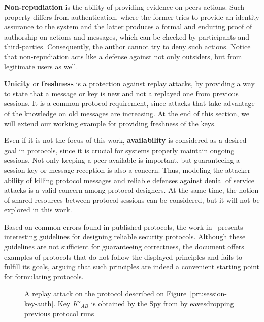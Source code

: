 \textbf{Non-repudiation} is the ability of providing evidence on peers actions. Such property differs from authentication, where the former tries to provide an identity assurance to the system and the latter produces a formal and enduring proof of authorship on actions and messages, which can be checked by participants and third-parties. Consequently, the author cannot try to deny such actions. Notice that non-repudiation acts like a defense against not only outsiders, but from legitimate users as well.

\textbf{Unicity} or \textbf{freshness} is a protection against replay attacks, by providing a way to state that a message or key is new and not a replayed one from previous sessions. It is a common protocol requirement, since attacks that take advantage of the knowledge on old messages are increasing. At the end of this section, we will extend our working example for providing freshness of the keys.

Even if it is not the focus of this work, \textbf{availability} is considered as a desired goal in protocols, since it is crucial for systems properly maintain ongoing sessions. Not only keeping a peer available is important, but guaranteeing a session key or message reception is also a concern. Thus, modeling the attacker ability of killing protocol messages and reliable defenses against denial of service attacks is a valid concern among protocol designers. At the same time, the notion of shared resources between protocol sessions can be considered, but it will not be explored in this work.

Based on common errors found in published protocols, the work in~\cite{AbadiNeedham96} presents interesting guidelines for designing reliable security protocols. Although these guidelines are not sufficient for guaranteeing correctness, the document offers examples of protocols that do not follow the displayed principles and fails to fulfill its goals, arguing that such principles are indeed a convenient starting point for formulating protocols.

\begin{figure}[!ht]\label{fig:attack-ex-replay}
  \centering

  \caption{A replay attack on the protocol described on Figure~\ref{prt:session-key-auth}. Key \(K'_{AB}\) is obtained by the Spy from by eavesdropping previous protocol runs}
\end{figure}

